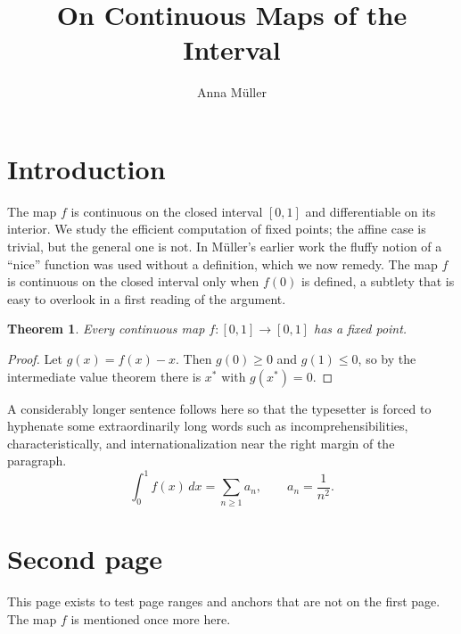 \documentclass[11pt]{article}
\title{On Continuous Maps of the Interval}
\author{Anna Müller}
\date{}
\newtheorem{theorem}{Theorem}
\begin{document}
\maketitle

\section{Introduction}
The map $f$ is continuous on the closed interval $[0,1]$ and differentiable on its interior.
We study the efficient computation of fixed points; the affine case is trivial, but the general
one is not. In Müller's earlier work the fluffy notion of a ``nice'' function was used without
a definition, which we now remedy. The map $f$ is continuous on the closed interval only when
$f(0)$ is defined, a subtlety that is easy to overlook in a first reading of the argument.

\begin{theorem}
Every continuous map $f\colon [0,1]\to[0,1]$ has a fixed point.
\end{theorem}
\begin{proof}
Let $g(x) = f(x) - x$. Then $g(0) \ge 0$ and $g(1) \le 0$, so by the intermediate value theorem
there is $x^\ast$ with $g(x^\ast) = 0$.
\end{proof}

A considerably longer sentence follows here so that the typesetter is forced to hyphenate some
extraordinarily long words such as incomprehensibilities, characteristically, and
internationalization near the right margin of the paragraph.
\[
  \int_0^1 f(x)\,dx = \sum_{n\ge 1} a_n, \qquad a_n = \frac{1}{n^2}.
\]

\newpage
\section{Second page}
This page exists to test page ranges and anchors that are not on the first page. The map $f$ is
mentioned once more here.
\end{document}
